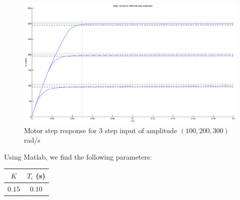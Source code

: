 \begin{center}
\begin{figure}[Ht]
 \includegraphics[width=\linewidth]{fig/StepPIspeed.eps}
 \caption{Motor step response for 3 step input of amplitude $(100,200,300)$ rad/s}
 \label{StepPIspeed}
\end{figure}
\end{center}


Using Matlab, we find the following parameters:
\begin{center}
 \begin{tabular}{|c|c|}
 \hline
 $K$ & $T_i$ (s) \\
 \hline
 $0.15$ & $0.10$ \\
 \hline
 \end{tabular}
\end{center}